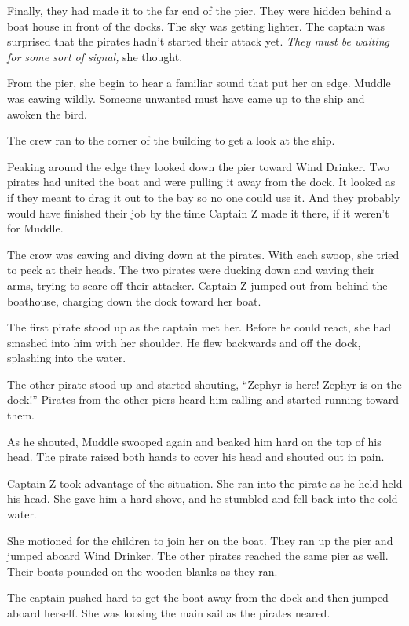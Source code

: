 \documentclass[12pt]{extbook}
\begin{document}
  Finally, they had made it to the far end of the pier. They were hidden
  behind a boat house in front of the docks. The sky was getting lighter.
  The captain was surprised that the pirates hadn't started their attack
  yet. \emph{They must be waiting for some sort of signal,} she thought.
  
  From the pier, she begin to hear a familiar sound that put her on edge.
  Muddle was cawing wildly. Someone unwanted must have came up to the ship
  and awoken the bird.
  
  The crew ran to the corner of the building to get a look at the ship.
  
  Peaking around the edge they looked down the pier toward Wind Drinker.
  Two pirates had united the boat and were pulling it away from the dock.
  It looked as if they meant to drag it out to the bay so no one could use
  it. And they probably would have finished their job by the time Captain
  Z made it there, if it weren't for Muddle.
  
  The crow was cawing and diving down at the pirates. With each swoop, she
  tried to peck at their heads. The two pirates were ducking down and
  waving their arms, trying to scare off their attacker. Captain Z jumped
  out from behind the boathouse, charging down the dock toward her boat.
  
  The first pirate stood up as the captain met her. Before he could react,
  she had smashed into him with her shoulder. He flew backwards and off
  the dock, splashing into the water.
  
  The other pirate stood up and started shouting, \enquote{Zephyr is here!
  Zephyr is on the dock!} Pirates from the other piers heard him calling
  and started running toward them.
  
  As he shouted, Muddle swooped again and beaked him hard on the top of
  his head. The pirate raised both hands to cover his head and shouted out
  in pain.
  
  Captain Z took advantage of the situation. She ran into the pirate as he
  held held his head. She gave him a hard shove, and he stumbled and fell
  back into the cold water.
  
  She motioned for the children to join her on the boat. They ran up the
  pier and jumped aboard Wind Drinker. The other pirates reached the same
  pier as well. Their boats pounded on the wooden blanks as they ran.
  
  The captain pushed hard to get the boat away from the dock and then
  jumped aboard herself. She was loosing the main sail as the pirates
  neared.
  
\end{document}

